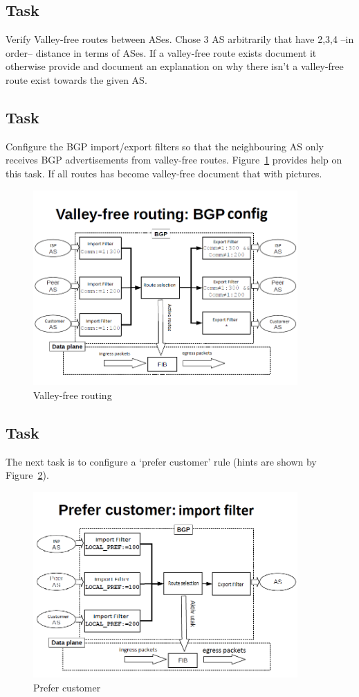 \documentclass[a4paper]{article}
\begin{document}
\subsection{Task}
Verify Valley-free routes between ASes. Chose 3 AS arbitrarily that have 2,3,4 --in order-- distance in terms of ASes.
If a valley-free route exists document it otherwise provide and document an explanation on why there isn't a
valley-free route exist towards the given AS.
\subsection{Task}
Configure the BGP import/export filters so that the neighbouring AS only receives BGP advertisements from valley-free
routes. Figure~\ref{fig:valley-free} provides help on this task. If all routes has become valley-free document that
with pictures.

\begin{figure}[H]
    \centering
    \includegraphics[width=0.9\textwidth]{figures/valley.PNG}
    \caption{Valley-free routing}
    \label{fig:valley-free}
\end{figure}

\subsection{Task}
The next task is to configure a `prefer customer' rule (hints are shown by Figure~\ref{fig:prefer-customer}).
\begin{figure}[H]
    \centering
    \includegraphics[width=0.9\textwidth]{figures/prefer.png}
    \caption{Prefer customer}
    \label{fig:prefer-customer}
\end{figure}
\end{document}
